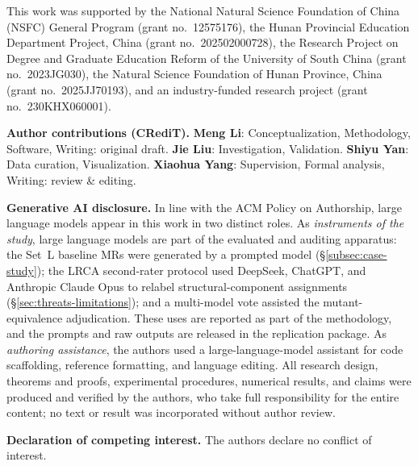 \documentclass[acmsmall,screen,review]{acmart}
\begin{document}
\begin{acks}
This work was supported by the National Natural Science Foundation of China (NSFC) General Program (grant no.\ 12575176), the Hunan Provincial Education Department Project, China (grant no.\ 202502000728), the Research Project on Degree and Graduate Education Reform of the University of South China (grant no.\ 2023JG030), the Natural Science Foundation of Hunan Province, China (grant no.\ 2025JJ70193), and an industry-funded research project (grant no.\ 230KHX060001).

\smallskip
\noindent\textbf{Author contributions (CRediT).}
\textbf{Meng Li}: Conceptualization, Methodology, Software, Writing: original draft.
\textbf{Jie Liu}: Investigation, Validation.
\textbf{Shiyu Yan}: Data curation, Visualization.
\textbf{Xiaohua Yang}: Supervision, Formal analysis, Writing: review \& editing.

\smallskip
\noindent\textbf{Generative AI disclosure.}
In line with the ACM Policy on Authorship, large language models appear in this work in two distinct roles. As \emph{instruments of the study}, large language models are part of the evaluated and auditing apparatus: the Set~L baseline MRs were generated by a prompted model (\S\ref{subsec:case-study}); the LRCA second-rater protocol used DeepSeek, ChatGPT, and Anthropic Claude Opus to relabel structural-component assignments (\S\ref{sec:threats-limitations}); and a multi-model vote assisted the mutant-equivalence adjudication. These uses are reported as part of the methodology, and the prompts and raw outputs are released in the replication package. As \emph{authoring assistance}, the authors used a large-language-model assistant for code scaffolding, reference formatting, and language editing. All research design, theorems and proofs, experimental procedures, numerical results, and claims were produced and verified by the authors, who take full responsibility for the entire content; no text or result was incorporated without author review.

\smallskip
\noindent\textbf{Declaration of competing interest.}
The authors declare no conflict of interest.
\end{acks}



\end{document}
